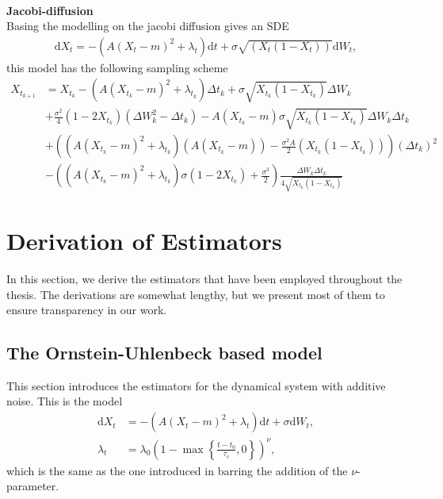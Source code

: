 \\
\textbf{Jacobi-diffusion}\\
Basing the modelling on the jacobi diffusion gives an SDE
\begin{align}
    \mathrm{d}X_t = -\left(A(X_t - m)^2 + \lambda_t\right)\mathrm{d}t + \sigma \sqrt{\left(X_t\left(1 - X_t\right)\right)}\mathrm{d}W_t,
\end{align}
this model has the following sampling scheme
\begin{align}
    X_{t_{k + 1}} &= X_{t_k} - \left(A(X_{t_k} - m)^2 + \lambda_{t_k}\right) \Delta t_k + \sigma \sqrt{X_{t_k}\left(1-X_{t_k}\right)} \Delta W_{k} \nonumber\\
    &+ \frac{\sigma^2}{4}\left(1 - 2X_{t_k}\right)\left(\Delta W_k^2 - \Delta t_k\right) - A\left(X_{t_k} - m\right)\sigma \sqrt{X_{t_k}\left(1 - X_{t_k}\right)}\Delta W_k\Delta t_k \nonumber \\
    &+ \left(\left(A\left(X_{t_k} - m\right)^2 + \lambda_{t_k}\right)\left(A\left(X_{t_k} - m\right)\right) - \frac{\sigma^2A}{2}\left(X_{t_k}\left(1 - X_{t_k}\right)\right)\right)\left(\Delta t_k\right)^2 \nonumber \\
    &- \left(\left(A\left(X_{t_k} - m\right)^2 + \lambda_{t_k}\right)\sigma\left(1 - 2X_{t_k}\right) + \frac{\sigma^3}{2}\right)\frac{\Delta W_k \Delta t_k}{4\sqrt{X_{t_k}\left(1 - X_{t_k}\right)}} \label{eq:jacobiDiffusion}
\end{align}
\newpage
\section{Derivation of Estimators}\label{sec:AppendixEstim}
In this section, we derive the estimators that have been employed throughout the thesis. The derivations are somewhat lengthy, but we present most of them to ensure transparency in our work.
\subsection{The Ornstein-Uhlenbeck based model}\label{subsec:OUprocess}
This section introduces the estimators for the dynamical system with additive noise. This is the model
\begin{align}
    \mathrm{d}X_t &= -\left(A\left(X_t - m\right)^2 + \lambda_t\right)\mathrm{d}t + \sigma \mathrm{d}W_t \label{eq:additiveModelAppedix},\\
    \lambda_t &= \lambda_0\left(1 - \max\left\{\frac{t - t_0}{\tau_c}, 0\right\}\right)^\nu,
\end{align}
which is the same as the one introduced in \cite[equation (1)]{Ditlevsen2023} barring the addition of the $\nu$-parameter.
